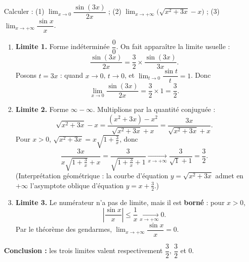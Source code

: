 \documentclass[11pt]{article}
\begin{document}
\begin{exoresolu}
Calculer : (1) $\lim_{x\to 0}\dfrac{\sin(3x)}{2x}$ ; (2) $\lim_{x\to+\infty}\bigl(\sqrt{x^2+3x}-x\bigr)$ ; (3) $\lim_{x\to+\infty}\dfrac{\sin x}{x}$.
\tcblower
\begin{enumerate}
\item \textbf{Limite 1.} Forme indéterminée $\dfrac{0}{0}$. On fait apparaître la limite usuelle :
\[ \frac{\sin(3x)}{2x}=\frac{3}{2}\times\frac{\sin(3x)}{3x}. \]
Posons $t=3x$ : quand $x\to 0$, $t\to 0$, et $\lim_{t\to 0}\dfrac{\sin t}{t}=1$. Donc
\[ \lim_{x\to 0}\frac{\sin(3x)}{2x}=\frac{3}{2}\times 1=\frac{3}{2}. \]
\item \textbf{Limite 2.} Forme $\infty-\infty$. Multiplions par la quantité conjuguée :
\[ \sqrt{x^2+3x}-x=\frac{(x^2+3x)-x^2}{\sqrt{x^2+3x}+x}=\frac{3x}{\sqrt{x^2+3x}+x}. \]
Pour $x>0$, $\sqrt{x^2+3x}=x\sqrt{1+\frac{3}{x}}$, donc
\[ \frac{3x}{x\sqrt{1+\frac{3}{x}}+x}=\frac{3}{\sqrt{1+\frac{3}{x}}+1}\xrightarrow[x\to+\infty]{}\frac{3}{\sqrt{1}+1}=\frac{3}{2}. \]
(Interprétation géométrique : la courbe d'équation $y=\sqrt{x^2+3x}$ admet en $+\infty$ l'asymptote oblique d'équation $y=x+\frac{3}{2}$.)
\item \textbf{Limite 3.} Le numérateur n'a pas de limite, mais il est \textbf{borné} : pour $x>0$,
\[ \left|\frac{\sin x}{x}\right|\leq \frac{1}{x}\xrightarrow[x\to+\infty]{}0. \]
Par le théorème des gendarmes, $\lim_{x\to+\infty}\dfrac{\sin x}{x}=0$.
\end{enumerate}
\textbf{Conclusion :} les trois limites valent respectivement $\dfrac{3}{2}$, $\dfrac{3}{2}$ et $0$.
\end{exoresolu}
\end{document}
